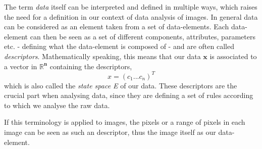 The term \textit{data} itself can be interpreted and defined in multiple ways, which raises the need for a definition in our context of data analysis of images.
In general data can be considered as an element taken from a set of data-elements. Each data-element can then be seen as a set of different components, attributes, parameters etc. - defining what the data-element is composed of - and are often called \textit{descriptors}. Mathematically speaking, this means that our data $\boldsymbol{x}$ is associated to a vector in $\boldsymbol{\mathbb{R}^n}$ containing the descriptors,
\begin{equation*}
	x = (c_1 ... c_n)^T
\end{equation*}
which is also called the \textit{state space E} of our data.
These descriptors are the crucial part when analysing data, since they are defining a set of rules according to which we analyse the raw data.

If this terminology is applied to images, the pixels or a range of pixels in each image can be seen as such an descriptor, thus the image itself as our data-element.


